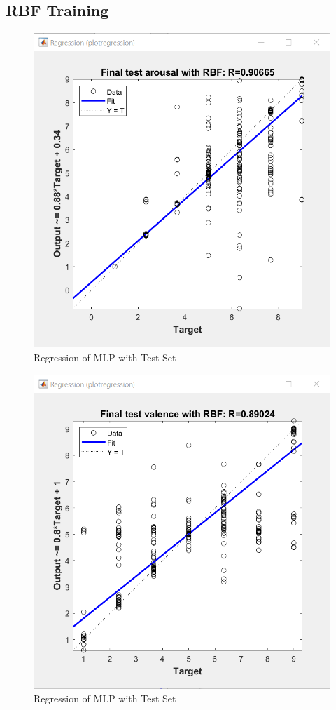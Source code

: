 \subsection{RBF Training}
\begin{figure}[H]
	\centering
	\includegraphics[width=0.6\linewidth]{img/arousal_rbf_1_3.png}
	\caption{Regression of MLP with Test Set}
\end{figure}
\begin{figure}[H]
	\centering
	\includegraphics[width=0.6\linewidth]{img/valence_rbf_0_7.png}
	\caption{Regression of MLP with Test Set}
\end{figure}
